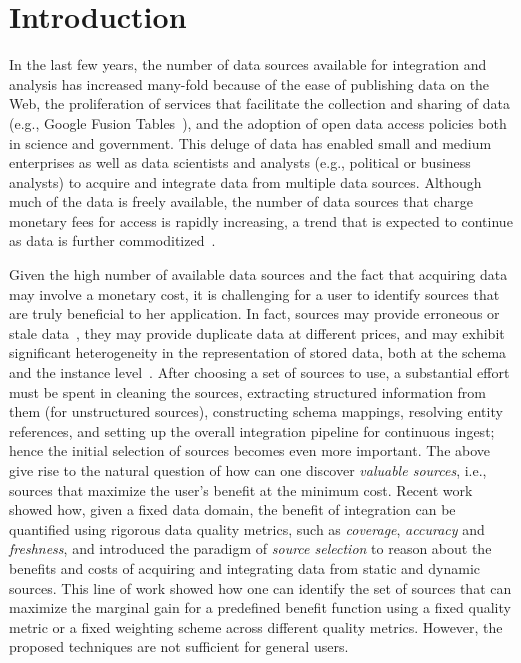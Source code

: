 \documentclass{sig-alternate}
\begin{document}
\section{Introduction}
In the last few years, the number of data sources available for integration and analysis has increased many-fold because of the ease of publishing data on the Web, the proliferation of services that facilitate the collection and sharing of data (e.g., Google Fusion Tables~\cite{gonzalez:2010}), and  the adoption of open data access policies both in science and government. This deluge of data has enabled small and medium enterprises as well as data scientists and analysts (e.g., political or business analysts) to acquire and integrate data from multiple data sources. Although much of the data is freely available, the number of data sources that charge monetary fees for access is rapidly increasing, a trend that is expected to continue as data is further commoditized~\cite{balazinska:vldb11,prasang:14}. 

Given the high number of available data sources and the fact that acquiring data may involve a monetary cost, it is challenging for a user to identify sources that are truly beneficial to her application. In fact, sources may provide erroneous or stale data~\cite{Dong_vldb:2009, li:2012}, they may provide duplicate data at different prices, and may exhibit significant heterogeneity in the representation of stored data, both at the schema and the instance level~\cite{bronzi:2013, li:2012, dassarma:2012}. After choosing a set of sources to use, a substantial effort must be spent in cleaning the sources, extracting structured information from them (for unstructured sources), constructing schema mappings, resolving entity references, and setting up the overall integration pipeline for continuous ingest; hence the initial selection of sources becomes even more important. The above give rise to the natural question of how can one discover {\em valuable sources}, i.e., sources that maximize the user's benefit at the minimum cost. Recent work~\cite{dong:vldb13,rekatsinas:2014} showed how, given a fixed data domain, the benefit of integration can be quantified using rigorous data quality metrics, such as {\em coverage}, {\em accuracy} and {\em freshness}, and introduced the paradigm of {\em source selection} to reason about the benefits and costs of acquiring and integrating data from static and dynamic sources. This line of work showed how one can identify the set of sources that can maximize the marginal gain for a predefined benefit function using a fixed quality metric or a fixed weighting scheme across different quality metrics. However, the proposed techniques are not sufficient for general users. 
\end{document}
